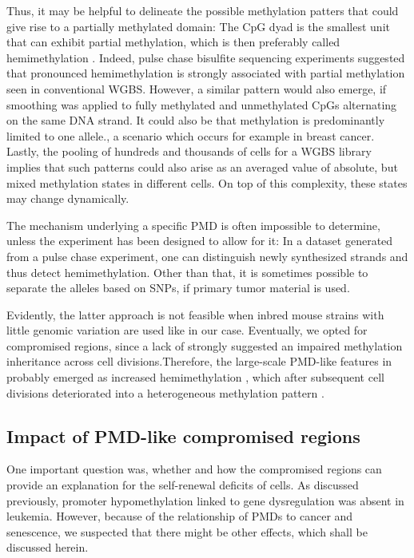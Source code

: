 Thus, it may be helpful to delineate the possible methylation patters that could give rise to a partially methylated domain:  The CpG dyad is the smallest unit that can exhibit partial methylation, which is then preferably called hemimethylation	. Indeed, pulse chase bisulfite sequencing experiments suggested that pronounced hemimethylation is strongly associated with partial methylation seen in conventional WGBS\cite{Xu2018b}. However, a similar pattern would also emerge, if smoothing was applied to fully methylated and unmethylated CpGs alternating on the same DNA strand. It could also be that methylation is predominantly limited to one allele., a scenario which occurs for example in breast cancer\cite{Hon2012}. Lastly, the pooling of hundreds and thousands of cells for a WGBS library implies that such patterns could also arise as an averaged value of absolute, but mixed methylation states in different cells. On top of this complexity, these states may change dynamically\cite{Luo2018}.  

The mechanism underlying a specific PMD is often impossible to determine, unless the experiment has been designed to allow for it: In a dataset generated from a pulse chase experiment, one can distinguish newly synthesized strands and thus detect hemimethylation\cite{Xu2018b}. Other than that, it is sometimes possible to separate the alleles based on SNPs, if primary tumor material is used\cite{Hon2012}. 

Evidently, the latter approach is not feasible when inbred mouse strains with little genomic variation are used like in our case. Eventually, we opted for compromised regions, since a lack of  strongly suggested an impaired methylation inheritance across cell divisions.Therefore, the large-scale PMD-like features in \dnmtchip probably emerged as increased hemimethylation , which after subsequent cell divisions deteriorated into a heterogeneous methylation pattern . 

\subsection{Impact of PMD-like compromised regions}
\label{chap:d:methylation:compromisedregions:effect}

One important question was, whether and how the compromised regions can provide an explanation for the self-renewal deficits of \dnmtchip \mllafnine \kithi cells. As discussed previously, promoter hypomethylation linked to gene dysregulation was absent in \dnmtchip leukemia. However, because of the relationship of PMDs to cancer and senescence, we suspected that there might be other effects, which shall be discussed herein.   

